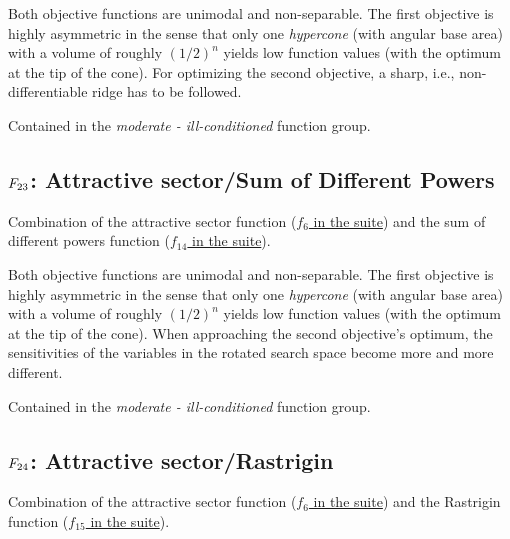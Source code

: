 Both objective functions are unimodal and non-separable. The
first objective is highly asymmetric in the sense that only one
\emph{hypercone} (with angular base area) with a volume of
roughly \((1/2)^n\) yields low function values (with the
optimum at the tip of the cone). For optimizing the second
objective, a sharp, i.e., non-differentiable ridge has to be followed.

Contained in the \emph{moderate - ill-conditioned} function group.



\subsection[\texorpdfstring{\protect\(F_{23}\protect\): Attractive sector/Sum of Different Powers}{F23: Attractive sector/Sum of Different Powers}]{\texorpdfstring{\protect\(F_{23}\protect\): Attractive sector/Sum of Different Powers}{}}
\label{index:f23}\label{index:attractive-sector-sum-of-different-powers}
Combination of the attractive sector function (\href{https://coco.gforge.inria.fr/downloads/download16.00/bbobdocfunctions.pdf\#page=30}{\(f_6\) in the \bbob suite}) and the sum of different powers function
(\href{https://coco.gforge.inria.fr/downloads/download16.00/bbobdocfunctions.pdf\#page=70}{\(f_{14}\) in the \bbob suite}).

Both objective functions are unimodal and non-separable. The
first objective is highly asymmetric in the sense that only one
\emph{hypercone} (with angular base area) with a volume of
roughly \((1/2)^n\) yields low function values (with the
optimum at the tip of the cone). When approaching the second
objective's optimum, the sensitivities of the variables in the
rotated search space become more and more different.

Contained in the \emph{moderate - ill-conditioned} function group.



\subsection[\texorpdfstring{\protect\(F_{24}\protect\): Attractive sector/Rastrigin}{F24: Attractive sector/Rastrigin}]{\texorpdfstring{\protect\(F_{24}\protect\): Attractive sector/Rastrigin}{}}
\label{index:attractive-sector-rastrigin}\label{index:f24}
Combination of the attractive sector function (\href{https://coco.gforge.inria.fr/downloads/download16.00/bbobdocfunctions.pdf\#page=30}{\(f_6\) in the \bbob suite}) and the Rastrigin function
(\href{https://coco.gforge.inria.fr/downloads/download16.00/bbobdocfunctions.pdf\#page=75}{\(f_{15}\) in the \bbob suite}).

